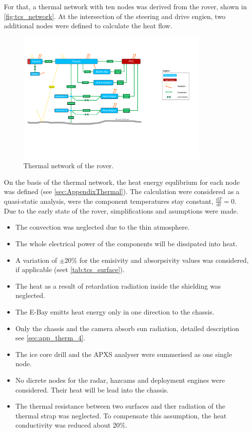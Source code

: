 For that, a thermal network with ten nodes was derived from the rover, shown in \autoref{fig:tcs_network}.
At the intersection of the steering and drive engien, two additional nodes were defined to calculate the heat flow.

\begin{figure}[H]
	\centering
	\includegraphics[width=0.85\textwidth]{Media/tcs_network}
	\caption{Thermal network of the rover.}
	\label{fig:tcs_network}
\end{figure}

On the basis of the thermal network, the heat energy equlibrium for each node was defined (see \autoref{sec:AppendixThermal}).
The calculation were considered as a quasi-static analysis, were the component temperatures stay constant, $\frac{\text{d}T}{\text{d}t}=0$.
Due to the early state of the rover, simplifications and asumptions were made.
\begin{itemize}
	\item The convection was neglected due to the thin atmosphere.
	\item The whole electrical power of the components will be dissipated into heat.
	\item A variation of $\pm 20\%$ for the emisivity and absorpsivity values was considered, if applicable (seet \autoref{tab:tcs_surface}).
	\item The heat as a result of retardation radiation inside the shielding was neglected.
	\item The E-Bay emitts heat energy only in one direction to the chassis.
	\item Only the chassis and the camera absorb sun radiation, detailed description see \autoref{sec:app_therm_4}.
	\item The ice core drill and the APXS analyser were summerised as one single node.
	\item No dicrete nodes for the radar, hazcams and deployment engines were considered. Their heat will be lead into the chassis.
	\item The thermal resistance between two surfaces and ther radiation of the thermal strap was neglected. To compensate this assumption, the heat conductivity was reduced about $20\%$.
\end{itemize}



